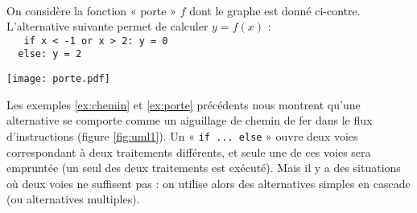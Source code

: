 \begin{ex}\label{ex:porte}\mbox{}\\
\begin{minipage}{11cm}
On considère la fonction « porte » $f$ dont le graphe est donné ci-contre.
L'alternative suivante permet de calculer $y = f(x)$ :\\
{\footnotesize\tt
\mbox{}\ \ if x < -1 or x > 2: y = 0\\
\mbox{}\ \ else: y = 2
}
\end{minipage}
\hfill
\begin{minipage}{4cm}
\centerline{\texttt{[image: porte.pdf]}}
\end{minipage}
\end{ex}
Les exemples \ref{ex:chemin} et \ref{ex:porte} précédents nous montrent
qu'une alternative se comporte comme un aiguillage de chemin de fer 
dans le flux d'instructions (figure \ref{fig:uml1}). 
Un « {\tt if ... else} » ouvre  deux voies correspondant à deux traitements différents, 
et seule une de ces voies sera empruntée (un seul des deux traitements est
exécuté). Mais il y a des situations où deux voies ne suffisent pas : on utilise
alors des alternatives simples en cascade (ou alternatives multiples). 

